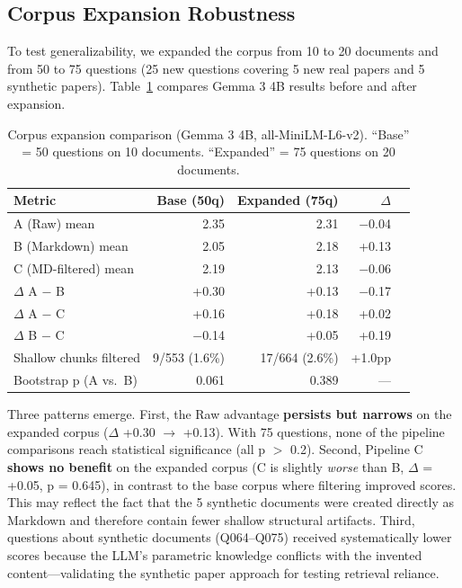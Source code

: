 \documentclass{article}
\begin{document}
\subsection{Corpus Expansion Robustness}

To test generalizability, we expanded the corpus from 10 to 20 documents and from 50 to 75 questions (25 new questions covering 5 new real papers and 5 synthetic papers). Table~\ref{tab:expanded} compares Gemma 3 4B results before and after expansion.

\begin{table}[t]
    \centering
    \caption{Corpus expansion comparison (Gemma 3 4B, all-MiniLM-L6-v2). ``Base'' = 50 questions on 10 documents. ``Expanded'' = 75 questions on 20 documents.}
    \label{tab:expanded}
    \begin{tabular}{lrrrr}
        \toprule
        Metric & Base (50q) & Expanded (75q) & $\Delta$ \\
        \midrule
        A (Raw) mean             & 2.35 & 2.31 & $-$0.04 \\
        B (Markdown) mean        & 2.05 & 2.18 & +0.13 \\
        C (MD-filtered) mean     & 2.19 & 2.13 & $-$0.06 \\
        \midrule
        $\Delta$ A $-$ B         & +0.30 & +0.13 & $-$0.17 \\
        $\Delta$ A $-$ C         & +0.16 & +0.18 & +0.02 \\
        $\Delta$ B $-$ C         & $-$0.14 & +0.05 & +0.19 \\
        \midrule
        Shallow chunks filtered  & 9/553 (1.6\%) & 17/664 (2.6\%) & +1.0pp \\
        Bootstrap p (A vs.\ B)   & 0.061 & 0.389 & --- \\
        \bottomrule
    \end{tabular}
\end{table}

Three patterns emerge. First, the Raw advantage \textbf{persists but narrows} on the expanded corpus ($\Delta$ +0.30 $\rightarrow$ +0.13). With 75 questions, none of the pipeline comparisons reach statistical significance (all p $>$ 0.2). Second, Pipeline C \textbf{shows no benefit} on the expanded corpus (C is slightly \emph{worse} than B, $\Delta$ = +0.05, p = 0.645), in contrast to the base corpus where filtering improved scores. This may reflect the fact that the 5 synthetic documents were created directly as Markdown and therefore contain fewer shallow structural artifacts. Third, questions about synthetic documents (Q064--Q075) received systematically lower scores because the LLM's parametric knowledge conflicts with the invented content---validating the synthetic paper approach for testing retrieval reliance.
\end{document}
